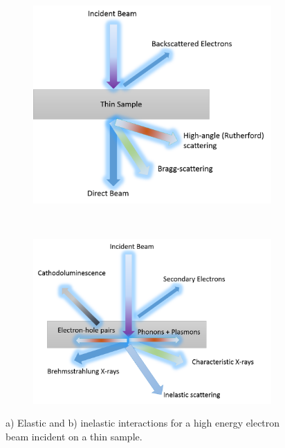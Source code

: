 \begin{figure}[h]
	\begin{subfigure}[t]{0.5\textwidth}
		\centering
		\includegraphics[width = 1\textwidth]{Figs/Ch2/elastic.png}
		\caption{}
	\end{subfigure}%
	\hspace*{1cm}
	~	
	\begin{subfigure}[t]{0.5\textwidth}
		\centering
		\includegraphics[width=1\textwidth]{Figs/Ch2/inelastic.png}
		\caption{}
	\end{subfigure}
	\caption {a) Elastic and b) inelastic interactions for a high energy electron beam incident on a thin sample. }
	\label{2.12}
\end{figure}
\FloatBarrier 

